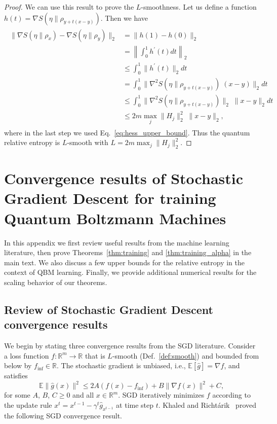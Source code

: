 \documentclass[
    aps,
    prx,
    onecolumn
]{revtex4-2}
\begin{document}
\begin{proof}
We can use this result to prove the $L$-smoothness. Let us define a function $h(t) = \nabla S(\eta \|\rho_{y + t(x - y)})$. Then we have
\begin{align}
\begin{split}
\| \nabla S(\eta \|\rho_{x}) - \nabla S(\eta \|\rho_{y}) \|_2 &= \| h(1) - h(0) \|_2 \\
&= \left\| \int_0^1 h^\prime(t) dt \right\|_2 \\
&\leq \int_0^1 \| h^\prime (t) \|_2 dt \\ 
&= \int_0^1 \| \nabla^2 S(\eta \|\rho_{y + t(x - y)}) \; (x - y) \|_2 dt  \\
&\leq \int_0^1 \| \nabla^2 S(\eta \|\rho_{y + t(x - y)}) \|_2 \; \| x - y \|_2  dt \\
&\leq 2m \max_j \| H_j \|_2^2 \; \| x - y \|_2 ,
\end{split}
\end{align}
where in the last step we used Eq.~\eqref{eq:hess_upper_bound}. Thus the quantum relative entropy is $L$-smooth with $L=2m \max_j \| H_j \|_2^2$.
\end{proof}


\section{Convergence results of Stochastic Gradient Descent for training Quantum Boltzmann Machines}
\label{app:thm1proof}

In this appendix we first review useful results from the machine learning literature, then prove Theorems~\ref{thm:training} and \ref{thm:training_alpha} in the main text. We also discuss a few upper bounds for the relative entropy in the context of QBM learning. Finally, we provide additional numerical results for the scaling behavior of our theorems.

\subsection{Review of Stochastic Gradient Descent convergence results}

We begin by stating three convergence results from the SGD literature. Consider a loss function $f : \mathbb{R}^m \rightarrow \mathbb{R}$ that is $L$-smooth (Def.~\ref{def:smooth}) and bounded from below by $f_\mathrm{inf} \in \mathbb{R}$. The stochastic gradient is unbiased, i.e., $\mathbb{E}[\hat{g}] = \nabla f$, and satisfies 
\begin{equation}
    \mathbb{E} \| \hat{g}(x) \|^2  \leq 2A (f(x) - f_\mathrm{inf}) + B \| \nabla f(x) \|^2 + C ,
\end{equation}
for some $A$, $B$, $C \geq 0$ and all $x \in \mathbb{R}^m$.
SGD iteratively minimizes $f$ according to the update rule $x^t = x^{t-1} - \gamma^t \hat{g}_{x^{t-1}}$ at time step $t$. Khaled and Richt{\'a}rik~\cite{Khaled2020} proved the following SGD convergence result.
\end{document}
